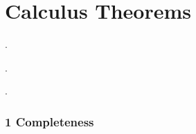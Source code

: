 \chapter{Calculus Theorems}

  {}%
  {}%
  {}%
  {}%
  {\bfseries}%
  {.}%
  { }%
  {}%

  {}%
  {}%
  {}%
  {}%
  {\bfseries}%
  {.}%
  { }%
  {}%

  {}%
  {}%
  {}%
  {}%
  {}%
  {.}%
  { }%
  {}%

\theoremstyle{ethantheorem}
\newtheorem*{theorem}{Theorem}

\theoremstyle{ethannamedtheorem}
\newtheorem*{namedtheorem}{Theorem}

\theoremstyle{ethandefinition}
\newtheorem*{definition}{Definition}

\subsection*{1 Completeness}
